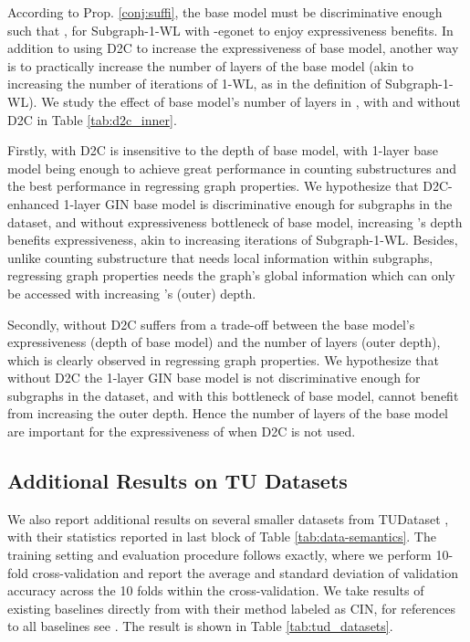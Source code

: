 {According to Prop. \ref{conj:suffi}, the base model must be discriminative enough such that , for Subgraph-1-WL with -egonet to enjoy expressiveness benefits. In addition to using D2C to increase the expressiveness of base model, another way is to practically increase the number of layers of the base model (akin to increasing the number of iterations of 1-WL, as in the definition of Subgraph-1-WL). We study the effect of base model's number of layers in \methodplus, with and without D2C in Table \ref{tab:d2c_inner}. \begin{compactitem}[\textbullet]
\item Firstly, \methodplus with D2C is insensitive to the depth of base model, with 1-layer base model being enough to achieve great performance in counting substructures and the best performance in regressing graph properties. We hypothesize that D2C-enhanced 1-layer GIN base model is discriminative enough for subgraphs in the dataset, and without expressiveness bottleneck of base model, increasing \methodplus's depth benefits expressiveness, akin to increasing iterations of Subgraph-1-WL. Besides, unlike counting substructure that needs local information within subgraphs, regressing graph properties needs the graph's global information which can only be accessed with increasing \methodplus's (outer) depth.


\item Secondly, \methodall without D2C suffers from a trade-off between the base model's expressiveness (depth of base model) and the number of \methodall layers (outer depth), which is clearly observed in regressing graph properties. We hypothesize that without D2C the 1-layer GIN base model is not discriminative enough for subgraphs in the dataset, and with this bottleneck of base model, \methodall cannot benefit from increasing the outer depth. Hence the number of layers of the base model are important for the expressiveness of \methodall when D2C is not used.
\end{compactitem}
}


\clearpage
\subsection{Additional Results on TU Datasets}\label{apdx:tu}
We also report additional results on several smaller datasets from TUDataset \citep{Morris+2020}, with their statistics reported in last block of Table \ref{tab:data-semantics}. The training setting and evaluation procedure follows \cite{xu2018powerful} exactly, where we perform 10-fold cross-validation and report the average and standard deviation of validation accuracy across the 10 folds within the cross-validation. We take results of existing baselines directly from \cite{bodnar2021b} with their method labeled as CIN, for references to all baselines see \cite{bodnar2021b}. The result is shown in Table \ref{tab:tud_datasets}.



